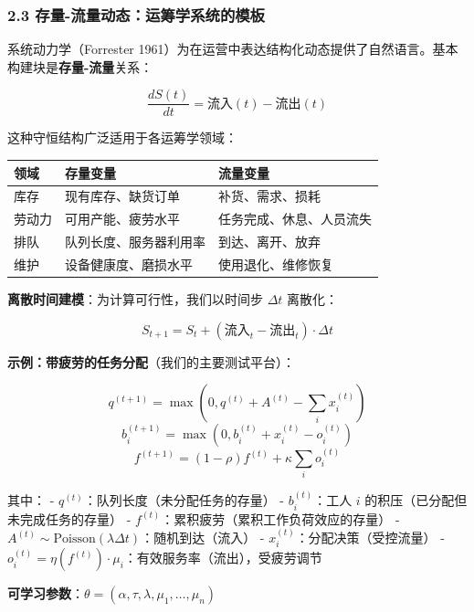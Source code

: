 \documentclass[UTF8]{ctexart}
\begin{document}
\hypertarget{ux5b58ux91cf-ux6d41ux91cfux52a8ux6001ux8fd0ux7b79ux5b66ux7cfbux7edfux7684ux6a21ux677f}{%
\subsubsection{2.3
存量-流量动态：运筹学系统的模板}\label{ux5b58ux91cf-ux6d41ux91cfux52a8ux6001ux8fd0ux7b79ux5b66ux7cfbux7edfux7684ux6a21ux677f}}

系统动力学（Forrester
1961）为在运营中表达结构化动态提供了自然语言。基本构建块是\textbf{存量-流量}关系：

\[\frac{dS(t)}{dt} = \text{流入}(t) - \text{流出}(t)\]

这种守恒结构广泛适用于各运筹学领域：

\begin{table}[h]
\centering
\begin{tabular}{p{3cm}p{5cm}p{6cm}}
\toprule
\textbf{领域} & \textbf{存量变量} & \textbf{流量变量} \\
\midrule
库存 & 现有库存、缺货订单 & 补货、需求、损耗 \\
劳动力 & 可用产能、疲劳水平 & 任务完成、休息、人员流失 \\
排队 & 队列长度、服务器利用率 & 到达、离开、放弃 \\
维护 & 设备健康度、磨损水平 & 使用退化、维修恢复 \\
\bottomrule
\end{tabular}
\end{table}

\textbf{离散时间建模}：为计算可行性，我们以时间步 \(\Delta t\) 离散化：

\[S_{t+1} = S_t + (\text{流入}_t - \text{流出}_t) \cdot \Delta t\]

\textbf{示例：带疲劳的任务分配}（我们的主要测试平台）：

\[q^{(t+1)} = \max\left(0, q^{(t)} + A^{(t)} - \textstyle\sum_i x_i^{(t)}\right)\]
\[b_i^{(t+1)} = \max\left(0, b_i^{(t)} + x_i^{(t)} - o_i^{(t)}\right)\]
\[f^{(t+1)} = (1-\rho) f^{(t)} + \kappa \textstyle\sum_i o_i^{(t)}\]

其中： - \(q^{(t)}\)：队列长度（未分配任务的存量） - \(b_i^{(t)}\)：工人 \(i\)
的积压（已分配但未完成任务的存量） -
\(f^{(t)}\)：累积疲劳（累积工作负荷效应的存量） -
\(A^{(t)} \sim \text{Poisson}(\lambda \Delta t)\)：随机到达（流入） -
\(x_i^{(t)}\)：分配决策（受控流量） -
\(o_i^{(t)} = \eta(f^{(t)}) \cdot \mu_i\)：有效服务率（流出），受疲劳调节

\textbf{可学习参数}：\(\theta = (\alpha, \tau, \lambda, \mu_1, \ldots, \mu_n)\)
\end{document}
